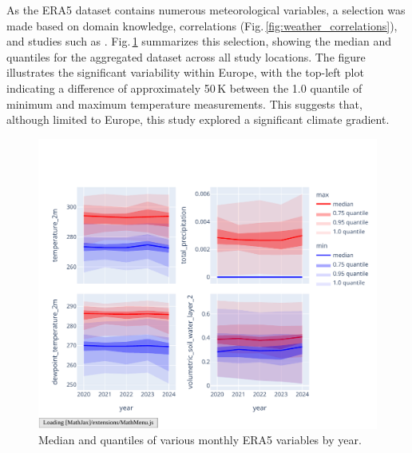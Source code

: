 As the ERA5 dataset contains numerous meteorological variables, a selection was made based on domain knowledge, correlations (Fig.\,\ref{fig:weather_correlations}), and studies such as \cite{climate_choice}. Fig.\,\ref{fig:selected_variables_stats} summarizes this selection, showing the median and quantiles for the aggregated dataset across all study locations. The figure illustrates the significant variability within Europe, with the top-left plot indicating a difference of approximately 50\,K between the 1.0 quantile of minimum and maximum temperature measurements. This suggests that, although limited to Europe, this study explored a significant climate gradient. 

\begin{figure}[ht]
    \centering
    \includegraphics[width=0.98\linewidth, trim={20pt 20pt 10pt 40pt}, clip]{figures/figures_climate/selected_variables_stats.pdf}
    \caption{Median and quantiles of various monthly ERA5 variables by year.}
    \label{fig:selected_variables_stats}
\end{figure}
